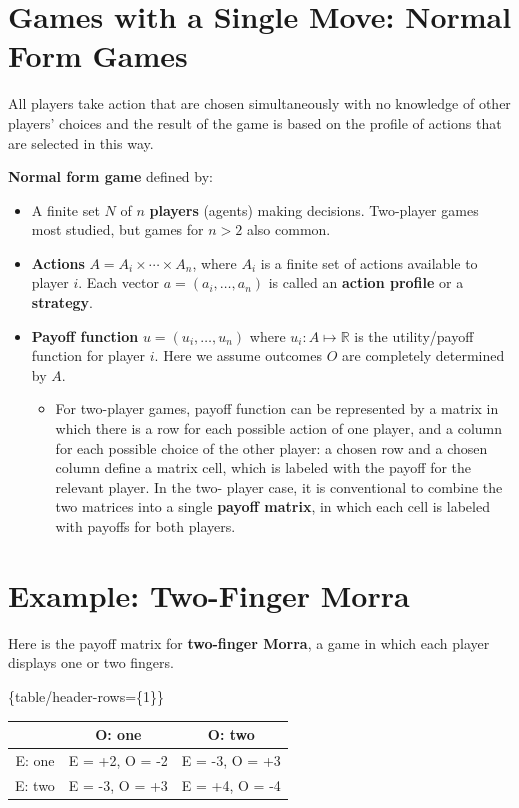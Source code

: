 \documentclass[11pt]{article}
\begin{document}
\section{Games with a Single Move: Normal Form Games}
\label{sec:orgef38c4c}

All players take action that are chosen simultaneously with no knowledge of other players' choices and the result of the game is based on the profile of actions that are selected in this way.

\textbf{Normal form game} defined by:

\begin{itemize}
\item A finite set \(N\) of \(n\) \textbf{players} (agents) making decisions. Two-player games most studied, but games for \(n > 2\) also common.

\item \textbf{Actions} \(A = A_i \times \cdots \times A_n\), where \(A_i\) is a finite set of actions available to player \(i\).  Each vector \(a = (a_i, \dots, a_n)\) is called an \textbf{action profile} or a \textbf{strategy}.

\item \textbf{Payoff function} \(u = (u_i, \dots, u_n)\) where \(u_i \colon A \mapsto \mathbb{R}\) is the utility/payoff function for player \(i\). Here we assume outcomes \(O\) are completely determined by \(A\).

\begin{itemize}
\item For two-player games, payoff function can be represented by a matrix in which there is a row for each possible action of one player, and a column for each possible choice of the other player: a chosen row and a chosen column define a matrix cell, which is labeled with the payoff for the relevant player. In the two- player case, it is conventional to combine the two matrices into a single \textbf{payoff matrix}, in which each cell is labeled with payoffs for both players.
\end{itemize}
\end{itemize}
\section{Example: Two-Finger Morra}
\label{sec:orgb0e03fd}

Here is the payoff matrix for \textbf{two-finger Morra}, a game in which each player displays one or two fingers.


\tagpdfsetup\{table/header-rows=\{1\}\}
\begin{tabular}{|c|c|c|}\hline
       & O: one         & O: two         \\\hline
E: one & E = +2, O = -2 & E = -3, O = +3 \\\hline
E: two & E = -3, O = +3 & E = +4, O = -4 \\\hline
\end{tabular}
\end{document}
